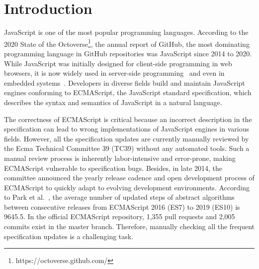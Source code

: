 \section{Introduction}\label{sec:intro}

JavaScript is one of the most popular programming languages.  According to the
2020 State of the Octoverse\footnote{https://octoverse.github.com/},
the annual report of GitHub, the most dominating programming language in GitHub
repositories was JavaScript since 2014 to 2020.  While JavaScript was initially
designed for client-side programming in web browsers, it is now widely used in
server-side programming~\cite{nodejs} and even in embedded
systems~\cite{espruino, tessel2, moddable}.  Developers in diverse fields
build and maintain JavaScript engines conforming to ECMAScript, the
JavaScript standard specification, which describes the syntax and semantics of
JavaScript in a natural language.

The correctness of ECMAScript is critical because an incorrect
description in the specification can lead to wrong
implementations of JavaScript engines in various fields.  However,
all the specification updates are currently manually reviewed by the Ecma
Technical Committee 39 (TC39) without any automated tools.
Such a manual review process is inherently labor-intensive and error-prone,
making ECMAScript vulnerable to specification bugs.
Besides, in late 2014, the committee announced the yearly release cadence and open development
process of ECMAScript to quickly adapt to evolving development environments.
According to Park et al.~\cite{jiset}, the average number of updated steps of abstract
algorithms between consecutive releases from ECMAScript 2016 (ES7) to 2019 (ES10) is 9645.5.
In the official ECMAScript repository, 1,355 pull
requests and 2,005 commits exist in the master branch.
Therefore, manually checking all the frequent specification updates is
a challenging task.

